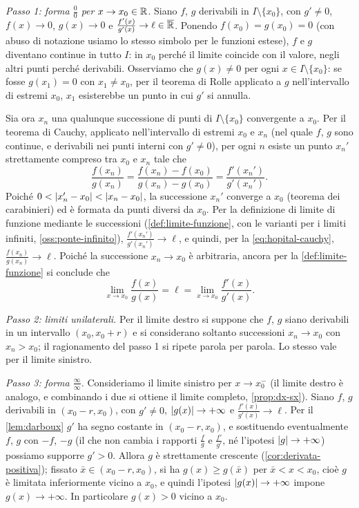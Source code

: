 \begin{dimostrazione}
\emph{Passo 1: forma $\frac00$ per $x\to x_{0}\in\mathbb{R}$.} Siano $f$, $g$ derivabili in
$I\setminus\{x_{0}\}$, con $g'\neq0$, $f(x)\to0$, $g(x)\to0$ e
$\frac{f'(x)}{g'(x)}\to\ell\in\overline{\mathbb{R}}$. Ponendo $f(x_{0})=g(x_{0})=0$ (con abuso di
notazione usiamo lo stesso simbolo per le funzioni estese), $f$ e $g$ diventano
continue in tutto $I$: in $x_{0}$ perché il limite coincide con il valore, negli altri
punti perché derivabili. Osserviamo che $g(x)\neq0$ per ogni $x\in I\setminus\{x_{0}\}$:
se fosse $g(x_{1})=0$ con $x_{1}\neq x_{0}$, per il teorema di Rolle applicato a $g$
nell'intervallo di estremi $x_{0}$, $x_{1}$ esisterebbe un punto in cui $g'$ si annulla.

Sia ora $x_{n}$ una qualunque successione di punti di $I\setminus\{x_{0}\}$ convergente
a $x_{0}$. Per il teorema di Cauchy, applicato nell'intervallo di estremi $x_{0}$ e
$x_{n}$ (nel quale $f$, $g$ sono continue, e derivabili nei punti interni con $g'\neq0$),
per ogni $n$ esiste un punto $x_{n}'$ strettamente compreso tra $x_{0}$ e $x_{n}$ tale che
\begin{equation}\label{eq:hopital-cauchy}
  \frac{f(x_{n})}{g(x_{n})}=\frac{f(x_{n})-f(x_{0})}{g(x_{n})-g(x_{0})}=\frac{f'(x_{n}')}{g'(x_{n}')} .
\end{equation}
Poiché $0<\lvert x_{n}'-x_{0}\rvert<\lvert x_{n}-x_{0}\rvert$, la successione $x_{n}'$ converge a $x_{0}$
(teorema dei carabinieri) ed è formata da punti diversi da $x_{0}$. Per la definizione di
limite di funzione mediante le successioni (\cref{def:limite-funzione}, con le varianti
per i limiti infiniti, \cref{oss:ponte-infinito}),
$\frac{f'(x_{n}')}{g'(x_{n}')}\to\ell$, e quindi, per la \eqref{eq:hopital-cauchy},
$\frac{f(x_{n})}{g(x_{n})}\to\ell$. Poiché la successione $x_{n}\to x_{0}$ è arbitraria,
ancora per la \cref{def:limite-funzione} si conclude che
\[
  \lim_{x\to x_{0}}\frac{f(x)}{g(x)}=\ell=\lim_{x\to x_{0}}\frac{f'(x)}{g'(x)} .
\]

\emph{Passo 2: limiti unilaterali.} Per il limite destro si suppone che $f$, $g$ siano
derivabili in un intervallo $(x_{0},x_{0}+r)$ e si considerano soltanto successioni
$x_{n}\to x_{0}$ con $x_{n}>x_{0}$; il ragionamento del passo 1 si ripete parola per
parola. Lo stesso vale per il limite sinistro.

\emph{Passo 3: forma $\frac\infty\infty$.} Consideriamo il limite sinistro per
$x\to x_{0}^{-}$ (il limite destro è analogo, e combinando i due si ottiene il limite
completo, \cref{prop:dx-sx}). Siano $f$, $g$ derivabili in $(x_{0}-r,x_{0})$, con
$g'\neq0$, $\lvert g(x)\rvert\to+\infty$ e $\frac{f'(x)}{g'(x)}\to\ell$. Per il
\cref{lem:darboux} $g'$ ha segno costante in $(x_{0}-r,x_{0})$, e sostituendo
eventualmente $f$, $g$ con $-f$, $-g$ (il che non cambia i rapporti $\frac fg$ e
$\frac{f'}{g'}$, né l'ipotesi $\lvert g\rvert\to+\infty$) possiamo supporre $g'>0$. Allora $g$ è
strettamente crescente (\cref{cor:derivata-positiva}); fissato $\bar x\in(x_{0}-r,x_{0})$,
si ha $g(x)\ge g(\bar x)$ per $\bar x<x<x_{0}$, cioè $g$ è limitata inferiormente vicino a
$x_{0}$, e quindi l'ipotesi $\lvert g(x)\rvert\to+\infty$ impone $g(x)\to+\infty$. In
particolare $g(x)>0$ vicino a $x_{0}$.


\end{dimostrazione}
